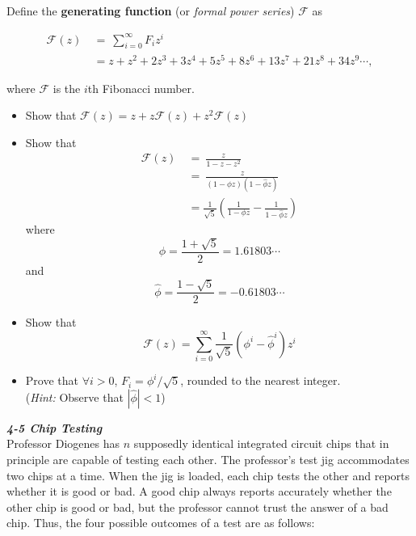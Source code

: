 \documentclass[12pt]{article}
\begin{document}
	\begin{flushleft}
		\quad Define the \textbf{generating function} (or \textit{formal power series}) $\mathcal{F}$ as
	\end{flushleft}
	\begin{equation*}
		\begin{split}
			\mathcal{F}(z) \ & = \ \sum_{i=0}^{\infty} F_{i}z^{i} \\
 			&= z+z^{2}+ 2z^{3}+ 3z^{4}+ 5z^{5}+ 8z^{6}+ 13z^{7}+ 21z^{8}+ 34z^{9} \cdots,
 		\end{split}
	\end{equation*}
	\begin{flushleft}
		where $\mathcal{F}$ is the $i$th Fibonacci number.
	\end{flushleft}
	\begin{itemize}
		\item Show that $\mathcal{F}(z)=z+z\mathcal{F}(z)+z^{2}\mathcal{F}(z)$
		\item Show that
		\begin{equation*}
			\begin{split}
				\mathcal{F}(z) \ & = \ \frac{z}{1-z-z^{2}} \\
				&= \ \frac{z}{(1-\phi{z})\left(1-\hat{\phi}z\right)} \\
				&= \frac{1}{\sqrt{5}}\left(\frac{1}{1-\phi{z}}-\frac{1}{1-\hat{\phi}z}\right)
			\end{split}
		\end{equation*}
		\phantom{}where
		$$\phi = \frac{1+\sqrt{5}}{2} = 1.61803 \cdots$$
		\phantom{}and
		$$\hat{\phi} = \frac{1-\sqrt{5}}{2} = -0.61803 \cdots$$
		\item Show that
		$$\mathcal{F}(z)=\sum_{i=0}^{\infty} \frac{1}{\sqrt{5}}\left(\phi^{i}-\hat{\phi}^{i}\right)z^{i}$$
		\item Prove that $\forall i>0$, $F_{i}=\phi^{i}/\sqrt{5}$, rounded to the nearest integer. \\
		\phantom{}(\textit{Hint:} Observe that $\left|\hat{\phi}\right|<1$)
	\end{itemize}
	\textbf{\textit{4-5 Chip Testing}} \\
	Professor Diogenes has $n$ supposedly identical integrated circuit chips that in principle are capable of testing each other. The professor's test jig accommodates two chips at a time. When the jig is loaded, each chip tests the other and reports whether it is good or bad. A good chip always reports accurately whether the other chip is good or bad, but the professor cannot trust the answer of a bad chip. Thus, the four possible outcomes of a test are as follows: \\
\end{document}
